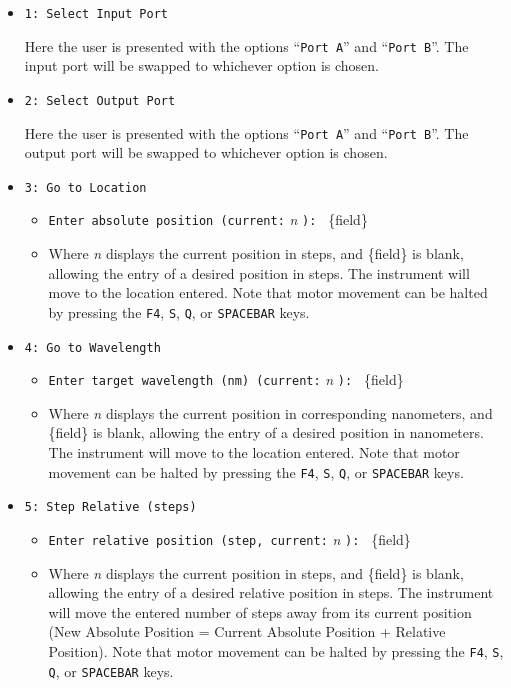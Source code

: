 \documentclass{article}
\begin{document}
\begin{itemize}
    \item \verb|1: Select Input Port|

    Here the user is presented with the options ``\verb|Port A|'' and ``\verb|Port B|''. The input port will be swapped to whichever option is chosen.

    \item \verb|2: Select Output Port|

    Here the user is presented with the options ``\verb|Port A|'' and ``\verb|Port B|''. The output port will be swapped to whichever option is chosen.

    \item \verb|3: Go to Location|
    \begin{itemize}
        \item \verb|Enter absolute position (current:| \emph{n} \verb|): | \{field\}
        \item Where \emph{n} displays the current position in steps, and \{field\} is blank, allowing the entry of a desired position in steps. The instrument will move to the location entered. Note that motor movement can be halted by pressing the \verb|F4|, \verb|S|, \verb|Q|, or \verb|SPACEBAR| keys.
    \end{itemize}
    \item \verb|4: Go to Wavelength|
    \begin{itemize}
        \item \verb|Enter target wavelength (nm) (current:| \emph{n} \verb|): | \{field\}
        \item Where \emph{n} displays the current position in corresponding nanometers, and \{field\} is blank, allowing the entry of a desired position in nanometers. The instrument will move to the location entered. Note that motor movement can be halted by pressing the \verb|F4|, \verb|S|, \verb|Q|, or \verb|SPACEBAR| keys.
    \end{itemize}
    \item \verb|5: Step Relative (steps)|
    \begin{itemize}
        \item \verb|Enter relative position (step, current:| \emph{n} \verb|): | \{field\}
        \item Where \emph{n} displays the current position in steps, and \{field\} is blank, allowing the entry of a desired relative position in steps. The instrument will move the entered number of steps away from its current position (New Absolute Position = Current Absolute Position + Relative Position). Note that motor movement can be halted by pressing the \verb|F4|, \verb|S|, \verb|Q|, or \verb|SPACEBAR| keys.

\end{itemize}
\end{itemize}
\end{document}
